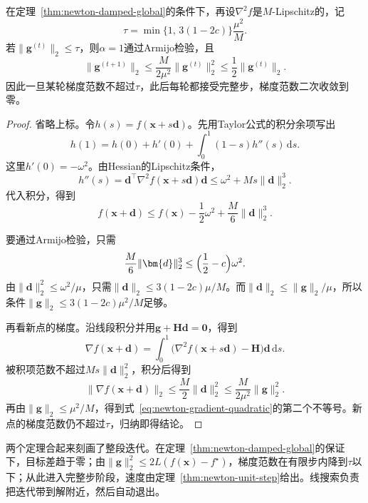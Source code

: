 \begin{theorem}[完整步的接受与二次收敛]
\label{thm:newton-unit-step}
在定理~\ref{thm:newton-damped-global}的条件下，再设$\nabla^2f$是$M$-Lipschitz的，记
\begin{equation}
 \tau=\min\bigl\{1,\,3(1-2c)\bigr\}\frac{\mu^2}{M}.
 \label{eq:newton-unit-threshold}
\end{equation}
若$\lVert\bm{g}^{(t)}\rVert_2\leq\tau$，则$\alpha=1$通过Armijo检验，且
\begin{equation}
 \lVert\bm{g}^{(t+1)}\rVert_2\leq\frac{M}{2\mu^2}\lVert\bm{g}^{(t)}\rVert_2^2\leq\frac12\lVert\bm{g}^{(t)}\rVert_2.
 \label{eq:newton-gradient-quadratic}
\end{equation}
因此一旦某轮梯度范数不超过$\tau$，此后每轮都接受完整步，梯度范数二次收敛到零。
\end{theorem}

\begin{proof}
省略上标。令$h(s)=f(\bm{x}+s\bm{d})$。先用Taylor公式的积分余项写出
\[
 h(1)=h(0)+h'(0)+\int_0^1(1-s)h''(s)\,\mathrm{d}s.
\]
这里$h'(0)=-\omega^2$。由Hessian的Lipschitz条件，
\[
 h''(s)=\bm{d}^\top\nabla^2f(\bm{x}+s\bm{d})\bm{d}\leq\omega^2+Ms\lVert\bm{d}\rVert_2^3.
\]
代入积分，得到
\[
 f(\bm{x}+\bm{d})\leq f(\bm{x})-\frac12\omega^2+\frac M6\lVert\bm{d}\rVert_2^3.
\]

要通过Armijo检验，只需
\[
 \frac M6\lVert\bm{d}\rVert_2^3\leq\Bigl(\frac12-c\Bigr)\omega^2.
\]
由$\lVert\bm{d}\rVert_2^2\leq\omega^2/\mu$，只需$\lVert\bm{d}\rVert_2\leq3(1-2c)\mu/M$。而$\lVert\bm{d}\rVert_2\leq\lVert\bm{g}\rVert_2/\mu$，所以条件$\lVert\bm{g}\rVert_2\leq3(1-2c)\mu^2/M$足够。

再看新点的梯度。沿线段积分并用$\bm{g}+\bm{H}\bm{d}=\bm{0}$，得到
\[
 \nabla f(\bm{x}+\bm{d})=\int_0^1\bigl(\nabla^2f(\bm{x}+s\bm{d})-\bm{H}\bigr)\bm{d}\,\mathrm{d}s.
\]
被积项范数不超过$Ms\lVert\bm{d}\rVert_2^2$，积分后得到
\[
 \lVert\nabla f(\bm{x}+\bm{d})\rVert_2\leq\frac M2\lVert\bm{d}\rVert_2^2\leq\frac{M}{2\mu^2}\lVert\bm{g}\rVert_2^2.
\]
再由$\lVert\bm{g}\rVert_2\leq\mu^2/M$，得到式~\eqref{eq:newton-gradient-quadratic}的第二个不等号。新点的梯度范数仍不超过$\tau$，归纳即得结论。
\end{proof}

两个定理合起来刻画了整段迭代。在定理~\ref{thm:newton-damped-global}的保证下，目标差趋于零；由$\lVert\bm{g}\rVert_2^2\leq2L(f(\bm{x})-f^\star)$，梯度范数在有限步内降到$\tau$以下；从此进入完整步阶段，速度由定理~\ref{thm:newton-unit-step}给出。线搜索负责把迭代带到解附近，然后自动退出。

